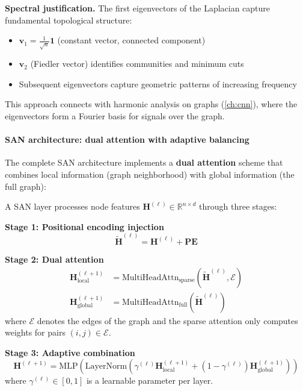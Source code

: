 \textbf{Spectral justification.}\label{rem:justification_spectral_pe} The first eigenvectors of the Laplacian capture fundamental topological structure:
\begin{itemize}
    \item $\mathbf{v}_1 = \frac{1}{\sqrt{n}}\mathbf{1}$ (constant vector, connected component)
    \item $\mathbf{v}_2$ (Fiedler vector) identifies communities and minimum cuts
    \item Subsequent eigenvectors capture geometric patterns of increasing frequency
\end{itemize}
This approach connects with harmonic analysis on graphs (\autoref{ch:cnn}), where the eigenvectors form a Fourier basis for signals over the graph.

\paragraph{SAN architecture: dual attention with adaptive balancing}

The complete SAN architecture implements a \textbf{dual attention} scheme that combines local information (graph neighborhood) with global information (the full graph):

\begin{definition}\label{def:san_layer}
A SAN layer processes node features $\mathbf{H}^{(\ell)} \in \mathbb{R}^{n \times d}$ through three stages:

\textbf{Stage 1: Positional encoding injection}
\begin{equation}
    \tilde{\mathbf{H}}^{(\ell)} = \mathbf{H}^{(\ell)} + \mathbf{PE}
    \label{eq:san_pe_injection}
\end{equation}

\textbf{Stage 2: Dual attention}
\begin{align}
    \mathbf{H}_{\text{local}}^{(\ell+1)} &= \text{MultiHeadAttn}_{\text{sparse}}\left(\tilde{\mathbf{H}}^{(\ell)}, \mathcal{E}\right) \label{eq:san_local_attn} \\
    \mathbf{H}_{\text{global}}^{(\ell+1)} &= \text{MultiHeadAttn}_{\text{full}}\left(\tilde{\mathbf{H}}^{(\ell)}\right) \label{eq:san_global_attn}
\end{align}
where $\mathcal{E}$ denotes the edges of the graph and the sparse attention only computes weights for pairs $(i,j) \in \mathcal{E}$.

\textbf{Stage 3: Adaptive combination}
\begin{equation}
    \mathbf{H}^{(\ell+1)} = \text{MLP}\left(\text{LayerNorm}\left(\gamma^{(\ell)} \mathbf{H}_{\text{local}}^{(\ell+1)} + (1-\gamma^{(\ell)}) \mathbf{H}_{\text{global}}^{(\ell+1)}\right)\right)
    \label{eq:san_adaptive_combination}
\end{equation}
where $\gamma^{(\ell)} \in [0,1]$ is a learnable parameter per layer.
\end{definition}

